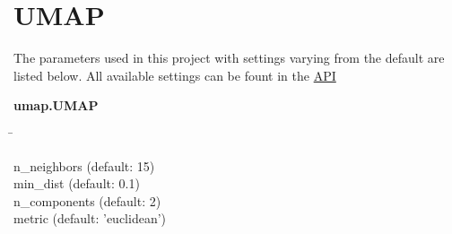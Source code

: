 \section{UMAP} \label{sec:UMAP}

\blindtext
\autocite{mcinnes_umap_2020}

The parameters used in this project with settings varying from the default are listed below. All available settings can be fount in the \href{https://umap-learn.readthedocs.io/en/latest/api.html}{API}

\begin{leftbar}
    \textbf{umap.UMAP}
    \begin{nstabbing}
        \qquad\qquad\qquad\qquad\qquad\quad\=\kill

        n\_neighbors \> (default: 15)\\
        
        min\_dist \> (default: 0.1)\\
        
        n\_components \> (default: 2)\\
        
        metric \> (default: 'euclidean')
    \end{nstabbing}
\end{leftbar}

